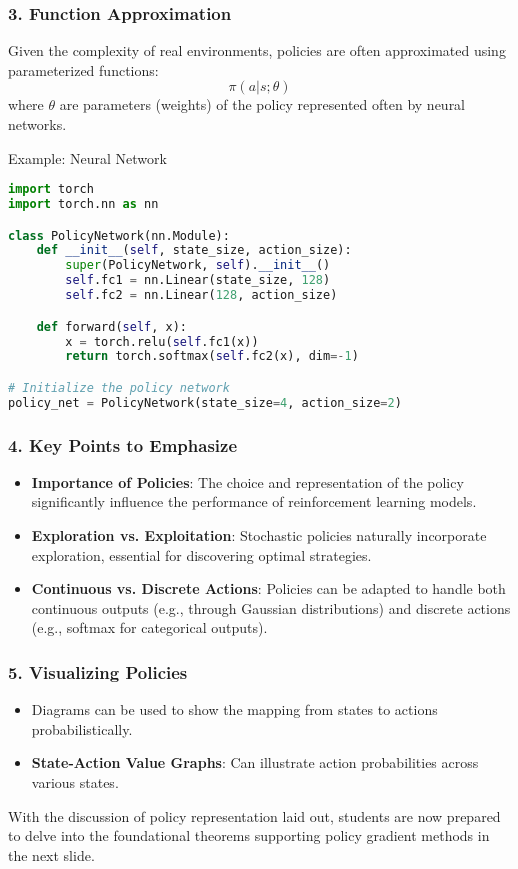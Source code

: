 \documentclass[aspectratio=169]{beamer}
\begin{document}
\begin{frame}[fragile]
  \frametitle{3. Function Approximation}
  Given the complexity of real environments, policies are often approximated using parameterized functions:
  \begin{equation}
    \pi(a|s; \theta)
  \end{equation}
  where \( \theta \) are parameters (weights) of the policy represented often by neural networks.

  \begin{block}{Example: Neural Network}
  \begin{lstlisting}[language=Python]
import torch
import torch.nn as nn

class PolicyNetwork(nn.Module):
    def __init__(self, state_size, action_size):
        super(PolicyNetwork, self).__init__()
        self.fc1 = nn.Linear(state_size, 128)
        self.fc2 = nn.Linear(128, action_size)

    def forward(self, x):
        x = torch.relu(self.fc1(x))
        return torch.softmax(self.fc2(x), dim=-1)

# Initialize the policy network
policy_net = PolicyNetwork(state_size=4, action_size=2)
  \end{lstlisting}
  \end{block}
\end{frame}

\begin{frame}[fragile]
  \frametitle{4. Key Points to Emphasize}
  \begin{itemize}
    \item \textbf{Importance of Policies}: The choice and representation of the policy significantly influence the performance of reinforcement learning models.
    \item \textbf{Exploration vs. Exploitation}: Stochastic policies naturally incorporate exploration, essential for discovering optimal strategies.
    \item \textbf{Continuous vs. Discrete Actions}: Policies can be adapted to handle both continuous outputs (e.g., through Gaussian distributions) and discrete actions (e.g., softmax for categorical outputs).
  \end{itemize}
\end{frame}

\begin{frame}[fragile]
  \frametitle{5. Visualizing Policies}
  \begin{itemize}
    \item Diagrams can be used to show the mapping from states to actions probabilistically.
    \item \textbf{State-Action Value Graphs}: Can illustrate action probabilities across various states.
  \end{itemize}
  With the discussion of policy representation laid out, students are now prepared to delve into the foundational theorems supporting policy gradient methods in the next slide.
\end{frame}
\end{document}
